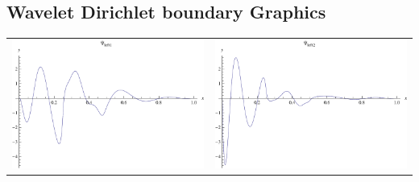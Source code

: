 \documentclass{article}
\begin{document}
\begin{landscape}
\subsection{Wavelet Dirichlet boundary Graphics}
\begin{tabular}{cc}
\includegraphics[width=10.cm]{octic_wavelet_dleft_1.pdf}& \includegraphics[width=10.cm]{octic_wavelet_dleft_2.pdf} \\
\end{tabular} 
 \\ 
\begin{tabular}{cc}

\end{tabular}
\end{landscape}
\end{document}
